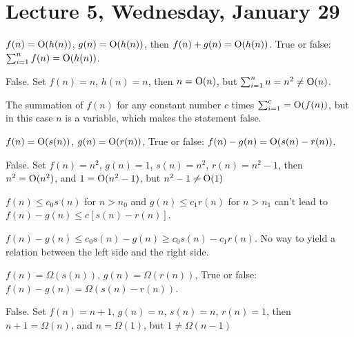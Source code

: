 \section{Lecture 5, Wednesday, January 29}

\begin{prob}

$f(n) = {\rm O}(h(n))$, $g(n) = {\rm O}(h(n))$, then $f(n) + g(n) = {\rm O} (h(n))$. True or false: $\sum_{i = 1}^n f(n) = {\rm O}(h(n))$.

False. Set $f(n) = n$, $h(n) = n$, then $n = {\rm O}(n)$, but $\sum_{i = 1}^n n = n^2 \neq {\rm O}(n)$.

\end{prob}

\begin{remark}

The summation of $f(n)$ for any constant number $c$ times $\sum_{i = 1}^c = {\rm O}(f(n))$, but in this case $n$ is a variable, which makes the statement false.

\end{remark}

\begin{prob}

$f(n) = {\rm O}(s(n))$, $g(n) = {\rm O}(r(n))$, True or false: $f(n) - g(n) = {\rm O}(s(n) - r(n))$.

False. Set $f(n) = n^2$, $g(n) = 1$, $s(n) = n^2$, $r(n) = n^2 - 1$, then $n^2 = {\rm O}(n^2)$, and $1 = {\rm O}(n^2 - 1)$, but $n^2 - 1 \neq {\rm O}(1)$

\end{prob}

\begin{remark}

$f(n) \leq c_0 s(n)$ for $n > n_0$ and $g(n) \leq c_1 r(n)$ for $n > n_1$ can't lead to $f(n) - g(n) \leq c [s(n) - r(n)]$.

$f(n) - g(n) \leq c_0 s(n) - g(n) \geq c_0 s(n) - c_1 r(n)$. No way to yield a relation between the left side and the right side.

\end{remark}

\begin{prob}

$f(n) = \Omega(s(n))$, $g(n) = \Omega(r(n))$, True or false: $f(n) - g(n) = \Omega(s(n) - r(n))$.

False. Set $f(n) = n + 1$, $g(n) = n$, $s(n) = n$, $r(n) = 1$, then $n + 1 = \Omega(n)$, and $n = \Omega(1)$, but $1 \neq \Omega(n - 1)$

\end{prob}

